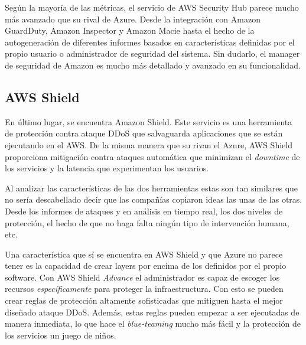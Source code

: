 \documentclass{article}
\begin{document}
Según la mayoría de las métricas, el servicio de AWS Security Hub parece mucho
más avanzado que su rival de Azure. Desde la integración con Amazon GuardDuty,
Amazon Inspector y Amazon Macie hasta el hecho de la autogeneración de
diferentes informes basados en características definidas por el propio usuario o
administrador de seguridad del sistema. Sin dudarlo, el manager de seguridad de
Amazon es mucho más detallado y avanzado en su funcionalidad.

\subsection*{AWS Shield}
En último lugar, se encuentra Amazon Shield. Este servicio es una herramienta de
protección contra ataque DDoS que salvaguarda aplicaciones que se están
ejecutando en el AWS. De la misma manera que su rivan el Azure, AWS Shield
proporciona mitigación contra ataques automática que minimizan el
\textit{downtime} de los servicios y la latencia que experimentan los usuarios. 

Al analizar las características de las dos herramientas estas son tan similares
que no sería descabellado decir que las compañías copiaron ideas las unas de las
otras. Desde los informes de ataques y en análisis en tiempo real, los dos
niveles de protección, el hecho de que no haga falta ningún tipo de intervención
humana, etc.

Una característica que sí se encuentra en AWS Shield y que Azure no parece tener
es la capacidad de crear layers por encima de los definidos por el propio
software. Con AWS Shield \textit{Advance} el administrador es capaz de escoger
los recursos \textit{específicamente} para proteger la infraestructura. Con esto
se pueden crear reglas de protección altamente sofisticadas que mitiguen hasta
el mejor diseñado ataque DDoS. Además, estas reglas pueden empezar a ser
ejecutadas de manera inmediata, lo que hace el \textit{blue-teaming} mucho más
fácil y la protección de los servicios un juego de niños.
\end{document}
